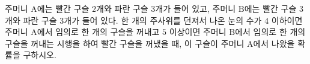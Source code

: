 주머니 $\mathrm{A}$에는 빨간 구슬 $2$개와 파란 구슬 $3$개가 들어 있고, 주머니 $\mathrm{B}$에는 빨간 구슬 $3$개와 파란 구슬 $3$개가 들어 있다. 한 개의 주사위를 던져서 나온 눈의 수가 $4$ 이하이면 주머니 $\mathrm{A}$에서 임의로 한 개의 구슬을 꺼내고 $5$ 이상이면 주머니 $\mathrm{B}$에서 임의로 한 개의 구슬을 꺼내는 시행을 하여 빨간 구슬을 꺼냈을 때, 이 구슬이 주머니 $\mathrm{A}$에서 나왔을 확률을 구하시오.
